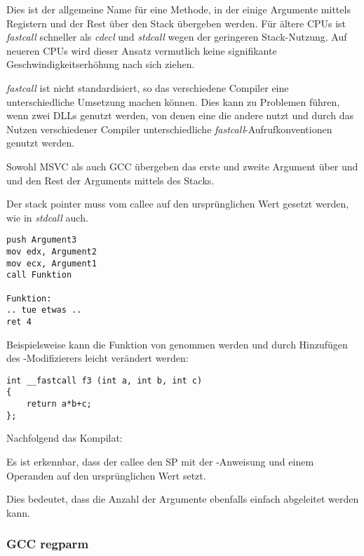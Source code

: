 Dies ist der allgemeine Name für eine Methode, in der einige Argumente mittels Registern und
der Rest über den Stack übergeben werden. Für ältere CPUs ist \emph{fastcall} schneller als
\emph{cdecl} und \emph{stdcall} wegen der geringeren Stack-Nutzung.
Auf neueren \ac{CPU}s wird dieser Ansatz vermutlich keine signifikante Geschwindigkeitserhöhung
nach sich ziehen.

\emph{fastcall} ist nicht standardisiert, so das verschiedene Compiler eine unterschiedliche
Umsetzung machen können.
Dies kann zu Problemen führen, wenn zwei DLLs genutzt werden, von denen eine die andere nutzt
und durch das Nutzen verschiedener Compiler unterschiedliche \emph{fastcall}-Aufrufkonventionen
genutzt werden.

Sowohl MSVC als auch GCC übergeben das erste und zweite Argument über \ECX und \EDX und den Rest
der Arguments mittels des Stacks.

Der \gls{stack pointer} muss vom \gls{callee} auf den ursprünglichen Wert gesetzt werden,
wie in \emph{stdcall} auch.

\begin{lstlisting}[caption=fastcall]
push Argument3
mov edx, Argument2
mov ecx, Argument1
call Funktion

Funktion:
.. tue etwas ..
ret 4
\end{lstlisting}

Beispielsweise kann die Funktion von  genommen werden und durch
Hinzufügen des -Modifizierers leicht verändert werden:

\begin{lstlisting}
int __fastcall f3 (int a, int b, int c)
{
	return a*b+c;
};
\end{lstlisting}

Nachfolgend das Kompilat:

%


Es ist erkennbar, dass der \gls{callee} den \ac{SP} mit der -Anweisung
und einem Operanden auf den ursprünglichen Wert setzt.

Dies bedeutet, dass die Anzahl der Argumente ebenfalls einfach abgeleitet werden kann.

\subsubsection{GCC regparm}

